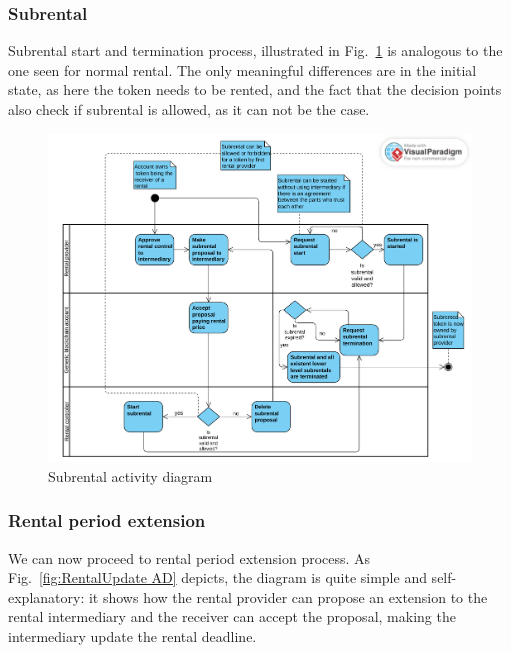\documentclass[english, LaM, oneside]{sapthesis}%
\begin{document}
\subsubsection{Subrental}

Subrental start and termination process, illustrated in Fig.~\ref{fig:Subrental AD} is analogous to the one seen for normal rental. The only meaningful differences are in the initial state, as here the token needs to be rented, and the fact that the decision points also check if subrental is allowed, as it can not be the case.

\begin{figure}[H]
    \centering
        \begin{adjustbox}{width=1\textwidth}
            \includegraphics{ActivityDiagrams/activity_subrental.pdf} 
        \end{adjustbox}
    \caption{Subrental activity diagram}
    \label{fig:Subrental AD}
\end{figure}

\subsubsection{Rental period extension}

We can now proceed to rental period extension process. As Fig.~\ref{fig:RentalUpdate AD} depicts, the diagram is quite simple and self-explanatory: it shows how the rental provider can propose an extension to the rental intermediary and the receiver can accept the proposal, making the intermediary update the rental deadline. 
\end{document}

